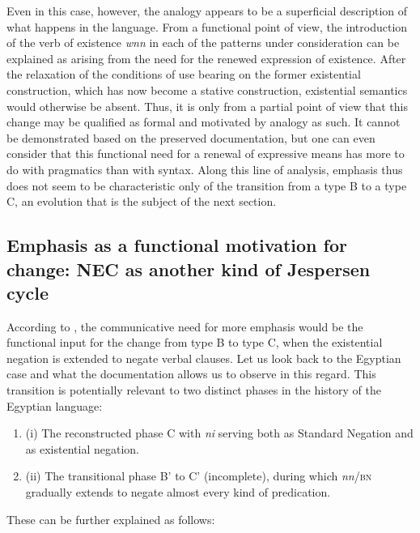 \documentclass[output=paper]{langsci/langscibook}
\newcommand{\ꜥ}{ʿ}
\newcommand{\ꜣ}{\kern-.25pt\texttt{ꜣ}\kern-.6pt}
\begin{document}
Even in this case, however, the analogy appears to be a superficial description of what happens in the language. From a functional point of view, the introduction of the verb of existence \textit{wnn} in each of the patterns under consideration can be explained as arising from the need for the renewed expression of existence. After the relaxation of the conditions of use bearing on the former existential construction, which has now become a stative construction, existential semantics would otherwise be absent. Thus, it is only from a partial point of view that this change may be qualified as formal and motivated by analogy as such. It cannot be demonstrated based on the preserved documentation, but one can even consider that this functional need for a renewal of expressive means has more to do with pragmatics than with syntax. Along this line of analysis, emphasis thus does not seem to be characteristic only of the transition from a type B to a type C, an evolution that is the subject of the next section.  

\subsection{Emphasis as a functional motivation for change: NEC as another kind of Jespersen cycle}\label{s:AE4-2}

According to \citet{Croft1991}, the communicative need for more emphasis would be the functional input for the change from type B to type C, when the existential negation is extended to negate verbal clauses. Let us look back to the Egyptian case and what the documentation allows us to observe in this regard. This transition is potentially relevant to two distinct phases in the history of the Egyptian language: 
 
\begin{enumerate}
    \item (i) The reconstructed phase C with \textit{ni} serving both as Standard Negation and as existential negation. 
    \item (ii) The transitional phase B’ to C’ (incomplete), during which \textit{nn}/\textsc{bn} gradually extends to negate almost every kind of predication. 
\end{enumerate} 

These can be further explained as follows: 
 
\end{document}
